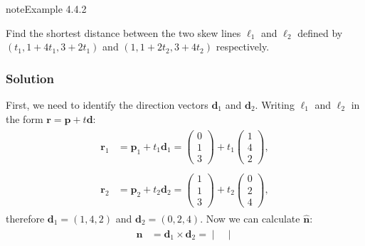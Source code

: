 \documentclass[letterpaper,10pt,english]{jupyterBook}
\begin{document}
\label{_pages/4.3_Shortest_distance_problems:line-line-distance-example}
\begin{sphinxadmonition}{note}{Example 4.4.2}



\sphinxAtStartPar
Find the shortest distance between the two skew lines \(\ell_1\) and \(\ell_2\) defined by \((t_1, 1 + 4t_1, 3 + 2 t_1)\) and \((1, 1 + 2t_2, 3 + 4t_2)\) respectively.
\subsubsection*{Solution}

\sphinxAtStartPar
First, we need to identify the direction vectors \(\mathbf{d}_1\) and \(\mathbf{d}_2\). Writing \(\ell_1\) and \(\ell_2\) in the form \(\mathbf{r} = \mathbf{p} + t \mathbf{d}\):
\begin{equation*}
\begin{split} \begin{align*}
    \mathbf{r}_1 &= \mathbf{p}_1 + t_1 \mathbf{d}_1 = \begin{pmatrix} 0 \\ 1 \\ 3 \end{pmatrix} + t_1
    \begin{pmatrix} 1 \\ 4 \\ 2 \end{pmatrix} , \\ \\
    \mathbf{r}_2 &= \mathbf{p}_2 + t_2 \mathbf{d}_2 = \begin{pmatrix} 1 \\ 1 \\ 3 \end{pmatrix} + t_2
    \begin{pmatrix} 0 \\ 2 \\ 4 \end{pmatrix},
\end{align*} \end{split}
\end{equation*}
\sphinxAtStartPar
therefore \(\mathbf{d}_1 = (1, 4, 2)\) and \(\mathbf{d}_2 = (0, 2, 4)\). Now we can calculate \(\hat{\mathbf{n}}\):
\begin{equation*}
\begin{split} \begin{align*}
    \mathbf{n} &= \mathbf{d}_1 \times \mathbf{d}_2
    = \begin{vmatrix}

\end{vmatrix}
\end{align*}
\end{split}
\end{equation*}
\end{sphinxadmonition}
\end{document}
